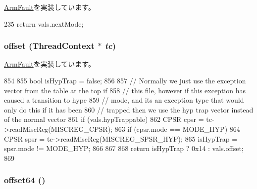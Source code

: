 \hyperlink{classArmISA_1_1ArmFault_a245c0940c93d0130b3efaf4e1d8ad542}{ArmFault}を実装しています。


\begin{DoxyCode}
235 { return vals.nextMode; }
\end{DoxyCode}
\hypertarget{classArmISA_1_1ArmFaultVals_abc6884c0ca3ffb06e3507e320c0d5089}{
\subsubsection[{offset}]{ offset ({\bf ThreadContext} $\ast$ {\em tc})}}
\label{classArmISA_1_1ArmFaultVals_abc6884c0ca3ffb06e3507e320c0d5089}


\hyperlink{classArmISA_1_1ArmFault_abd70b2c2ab6d989305cd72d37594cf70}{ArmFault}を実装しています。


\begin{DoxyCode}
854 {
855     bool isHypTrap = false;
856 
857     // Normally we just use the exception vector from the table at the top if
858     // this file, however if this exception has caused a transition to hype
859     // mode, and its an exception type that would only do this if it has been
860     // trapped then we use the hyp trap vector instead of the normal vector
861     if (vals.hypTrappable) {
862         CPSR cpsr = tc->readMiscReg(MISCREG_CPSR);
863         if (cpsr.mode == MODE_HYP) {
864             CPSR spsr = tc->readMiscReg(MISCREG_SPSR_HYP);
865             isHypTrap = spsr.mode != MODE_HYP;
866         }
867     }
868     return isHypTrap ? 0x14 : vals.offset;
869 }
\end{DoxyCode}
\hypertarget{classArmISA_1_1ArmFaultVals_a81e30246c00f10182deda977ba385832}{
\subsubsection[{offset64}]{ offset64 ()}}
\label{classArmISA_1_1ArmFaultVals_a81e30246c00f10182deda977ba385832}


